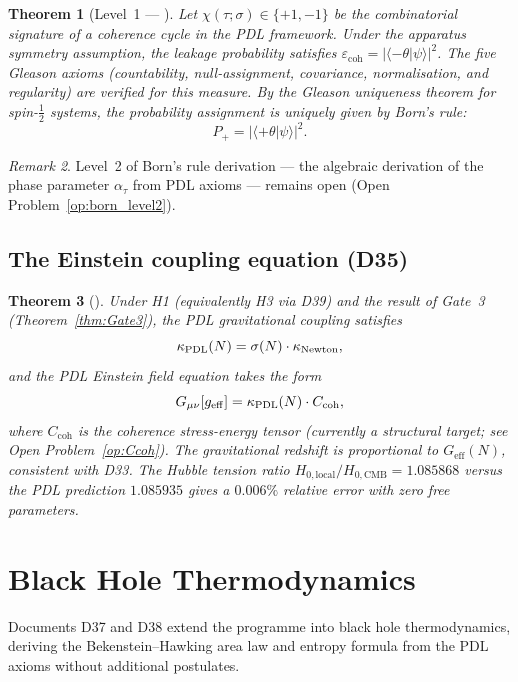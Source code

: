 \documentclass[11pt,a4paper]{article}
\theoremstyle{plain}
\newtheorem{theorem}{Theorem}[section]
\theoremstyle{definition}
\theoremstyle{remark}
\newtheorem{remark}[theorem]{Remark}
\newcommand{\PDL}{\textnormal{PDL}}
\newcommand{\Geff}{G_{\mathrm{eff}}}
\begin{document}
\begin{theorem}[Level~1 — \citep{D34}]
\label{thm:Born}
Let $\chi(\tau;\sigma)\in\{+1,-1\}$ be the combinatorial signature of a coherence cycle in the PDL framework.
Under the apparatus symmetry assumption, the leakage probability satisfies $\varepsilon_{\mathrm{coh}}=|\langle{-\theta}|\psi\rangle|^2$.
The five Gleason axioms (countability, null-assignment, covariance, normalisation, and regularity) are verified for this measure.
By the Gleason uniqueness theorem for spin-$\tfrac{1}{2}$ systems, the probability assignment is uniquely given by Born's rule:
\[
P_+ = |\langle{+\theta}|\psi\rangle|^2.
\]
\end{theorem}

\begin{remark}
Level~2 of Born's rule derivation — the algebraic derivation of the phase parameter $\alpha_\tau$ from PDL axioms — remains open (Open Problem~\ref{op:born_level2}).
\end{remark}

\subsection{The Einstein coupling equation (D35)}
\label{subsec:einstein}

\begin{theorem}[\citep{D35}]
\label{thm:Einstein}
Under H1 (equivalently H3 via D39) and the result of Gate~3 (Theorem~\ref{thm:Gate3}), the PDL gravitational coupling satisfies
\[
\kappa_{\PDL}(N) = \sigma(N)\cdot\kappa_{\mathrm{Newton}},
\]
and the PDL Einstein field equation takes the form
\[
G_{\mu\nu}[g_{\mathrm{eff}}] = \kappa_{\PDL}(N)\cdot C_{\mathrm{coh}},
\]
where $C_{\mathrm{coh}}$ is the coherence stress-energy tensor (currently a structural target; see Open Problem~\ref{op:Ccoh}).
The gravitational redshift is proportional to $\Geff(N)$, consistent with D33.
The Hubble tension ratio $H_{0,\mathrm{local}}/H_{0,\mathrm{CMB}}=1.085868$ versus the PDL prediction $1.085935$ gives a $0.006\%$ relative error with zero free parameters.
\end{theorem}

\section{Black Hole Thermodynamics}
\label{sec:bh}

Documents D37 and D38 extend the programme into black hole thermodynamics, deriving the Bekenstein--Hawking area law and entropy formula from the PDL axioms without additional postulates.
\end{document}
